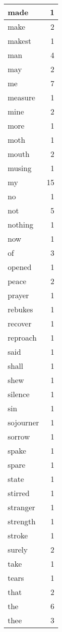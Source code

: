 \begin{center}
\begin{longtable}{l|r}
made & 1 \\ \hline
make & 2 \\ \hline
makest & 1 \\ \hline
man & 4 \\ \hline
may & 2 \\ \hline
me & 7 \\ \hline
measure & 1 \\ \hline
mine & 2 \\ \hline
more & 1 \\ \hline
moth & 1 \\ \hline
mouth & 2 \\ \hline
musing & 1 \\ \hline
my & 15 \\ \hline
no & 1 \\ \hline
not & 5 \\ \hline
nothing & 1 \\ \hline
now & 1 \\ \hline
of & 3 \\ \hline
opened & 1 \\ \hline
peace & 2 \\ \hline
prayer & 1 \\ \hline
rebukes & 1 \\ \hline
recover & 1 \\ \hline
reproach & 1 \\ \hline
said & 1 \\ \hline
shall & 1 \\ \hline
shew & 1 \\ \hline
silence & 1 \\ \hline
sin & 1 \\ \hline
sojourner & 1 \\ \hline
sorrow & 1 \\ \hline
spake & 1 \\ \hline
spare & 1 \\ \hline
state & 1 \\ \hline
stirred & 1 \\ \hline
stranger & 1 \\ \hline
strength & 1 \\ \hline
stroke & 1 \\ \hline
surely & 2 \\ \hline
take & 1 \\ \hline
tears & 1 \\ \hline
that & 2 \\ \hline
the & 6 \\ \hline
thee & 3 \\ \hline

\end{longtable}
\end{center}
